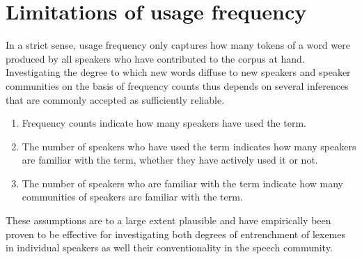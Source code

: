 \section{Limitations of usage frequency}

  In a strict sense, usage frequency only captures how many tokens of a word were produced by all speakers who have contributed to the corpus at hand. Investigating the degree to which new words diffuse to new speakers and speaker communities on the basis of frequency counts thus depends on several inferences that are commonly accepted as sufficiently reliable.

  \begin{enumerate}
    \item Frequency counts indicate how many speakers have used the term.
    \item The number of speakers who have used the term indicates how many speakers are familiar with the term, whether they have actively used it or not.
    \item The number of speakers who are familiar with the term indicate how many communities of speakers are familiar with the term.
  \end{enumerate}

  These assumptions are to a large extent plausible and have empirically been proven to be effective for investigating both degrees of entrenchment of lexemes in individual speakers as well their conventionality in the speech community.
